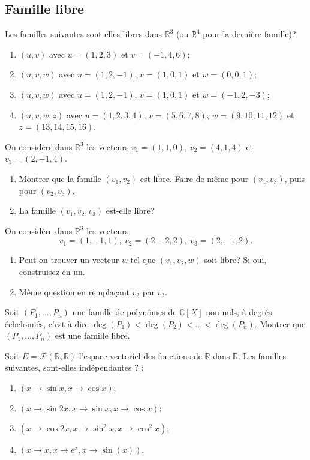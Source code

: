 \documentclass{book}
\begin{document}
\subsection{Famille libre}
 \begin{Exercice}
Les familles suivantes sont-elles libres dans $\mathbb R^3$ (ou $\mathbb R^4$ pour la dernière famille)?
\begin{enumerate}
\item $(u,v)$ avec $u=(1,2,3)$ et $v=(-1,4,6)$;
\item $(u,v,w)$ avec $u=(1,2,-1)$, $v=(1,0,1)$ et $w=(0,0,1)$;
\item $(u,v,w)$ avec $u=(1,2,-1)$, $v=(1,0,1)$ et $w=(-1,2,-3)$;
\item $(u,v,w,z)$ avec $u=(1,2,3,4)$, $v=(5,6,7,8)$, $w=(9,10,11,12)$ et $z=(13,14,15,16)$.
\end{enumerate}
\end{Exercice}
 \begin{Exercice}
On considère dans $\mathbb R^3$ les vecteurs 
$v_1=(1,1,0)$, $v_2=(4,1,4)$ et $v_3=(2,-1,4)$.
\begin{enumerate}
\item Montrer que la famille $(v_1,v_2)$ est libre. Faire de même pour $(v_1,v_3)$, puis pour $(v_2,v_3)$.
\item La famille $(v_1,v_2,v_3)$ est-elle libre?
\end{enumerate}
\end{Exercice}

\begin{Exercice}
On considère dans $\mathbb R^3$ les vecteurs 
$$v_1=(1,-1,1),\ v_2=(2,-2,2),\ v_3=(2,-1,2).$$
\begin{enumerate}
\item Peut-on trouver un vecteur $w$ tel que $(v_1,v_2,w)$ soit libre?
Si oui, construisez-en un.
\item Même question en remplaçant $v_2$ par $v_3$.
\end{enumerate}
\end{Exercice}

\begin{Exercice}
Soit $(P_1,\dots,P_n)$ une famille de polynômes de $\mathbb C[X]$ non nuls, à degrés échelonnés, c'est-à-dire
$\deg(P_1)<\deg(P_2)<\dots<\deg(P_n)$. Montrer que $(P_1,\dots,P_n)$ est une famille libre.
\end{Exercice}


\begin{Exercice}[Fonctions]
Soit $E=\mathcal F(\mathbb R,\mathbb R)$ l'espace vectoriel des fonctions de $\mathbb R$ dans $\mathbb R$. Les familles suivantes, sont-elles indépendantes ? :
\begin{enumerate}
\item $(x\to\sin x,x\to\cos x)$;
\item $(x\to\sin 2x,x\to\sin x,x\to\cos x)$;
\item $(x\to\cos 2x,x\to\sin^2 x,x\to\cos^2 x)$;
\item $(x\to x,x\to e^x,x\to\sin(x))$.
\end{enumerate}
\end{Exercice}
\end{document}
